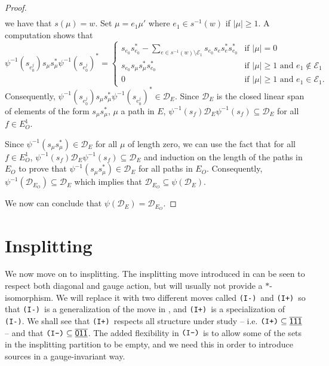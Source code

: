 \documentclass[12pt]{amsbook}%
\theoremstyle{defin}
\theoremstyle{remark}
\numberwithin{equation}{chapter}
\numberwithin{theor}{section}
\newcommand{\xyzrel}[1]{\mbox{$\overline{\underline{\mathsf{ #1}}}$}}
\newcommand{\IIIm}{\mbox{\texttt{\textup{(I-)}}}}
\newcommand{\IIIp}{\mbox{\texttt{\textup{(I+)}}}}
\begin{document}
\begin{proof}
\begin{align*}
\end{align*}
we have that $s(\mu ) = w$.  Set $\mu = e_1 \mu'$ where $e_1 \in s^{-1} (w)$ if $|\mu| \geq 1$.  A computation shows that 
\[
\psi^{-1} ( s_{ e_0^j } ) s_\mu s_\mu^* \psi^{-1} ( s_{e_0^j} )^* =
\begin{cases}
\displaystyle s_{e_0} s_{e_0}^* - \sum_{ e \in s^{-1} (w) \setminus \mathcal{E}_1 }s_{ e_0}s_{e } s_{e }^*s_{e_0}^* &\text{if } |\mu| = 0 \\
s_{e_0}  s_{\mu} s_{ \mu}^* s_{e_0}^*  &\text{if } | \mu | \geq 1 \text{ and } e_1 \notin \mathcal{E}_1 \\
0 &\text{if } | \mu | \geq 1 \text{ and } e_1 \in \mathcal{E}_1.
\end{cases}
\]
Consequently, $\psi^{-1} ( s_{ e_0^j } ) s_\mu s_\mu^* \psi^{-1} ( s_{e_0^j} )^* \in \mathcal{D}_E$.  Since $\mathcal{D}_E$ is the closed linear span of elements of the form $s_\mu s_\mu^*$, $\mu$ a path in $E$, $\psi^{-1}( s_f ) \mathcal{D}_E \psi^{-1}( s_f ) \subseteq \mathcal{D}_E$ for all $f \in E_O^1$.

Since $\psi^{-1} ( s_\mu s_\mu^*) \in \mathcal{D}_E$ for all $\mu$ of length zero, we can use the fact that for all $f \in E_O^1$, $\psi^{-1}( s_f ) \mathcal{D}_E \psi^{-1}( s_f ) \subseteq \mathcal{D}_E$ and induction on the length of the paths in $E_{O}$ to prove that $\psi^{-1} ( s_\mu s_\mu^*) \in \mathcal{D}_E$ for all paths in $E_O$.  Consequently, $\psi^{-1} ( \mathcal{D}_{E_O} ) \subseteq \mathcal{D}_E$ which implies that $\mathcal{D}_{E_O} \subseteq \psi ( \mathcal{D}_E )$.  

We now can conclude that $\psi ( \mathcal{D}_E ) = \mathcal{D}_{E_O}$.
\end{proof}
 



\section{Insplitting}
We now move on to insplitting. The insplitting move introduced in \cite{tbdp:fega} can be seen to respect both diagonal and gauge action, but will usually not provide a $*$-isomorphism. We will replace it with two different moves called \IIIm\ and  \IIIp\ so that \IIIm\ is a generalization of the move in \cite{tbdp:fega}, and \IIIp\ is a specialization of \IIIm. We shall see that \IIIp\ respects all structure under study -- i.e. $\IIIp\subseteq\xyzrel{111}$ -- and that $\IIIm\subseteq\xyzrel{011}$. The added flexibility in $\IIIm$  is to allow some of the sets in the insplitting partition to be empty, and we need this in order to introduce sources in a gauge-invariant way.
\end{document}
